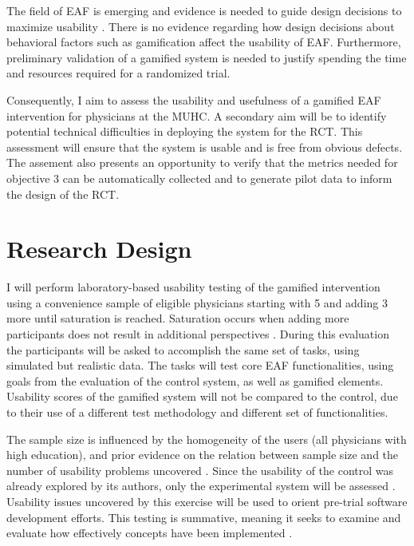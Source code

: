 %
%
The field of \gls{EAF} is emerging and evidence is needed to guide design decisions to maximize usability \cite{brown2016interface}. There is no evidence regarding how design decisions about behavioral factors such as gamification affect the usability of \gls{EAF}. Furthermore, preliminary validation of a gamified system is needed to justify spending the time and resources required for a randomized trial.

Consequently, I aim to assess the usability and usefulness of a gamified \gls{EAF} intervention for physicians at the \gls{MUHC}. A secondary aim will be to identify potential technical difficulties in deploying the system for the \gls{RCT}. This assessment will ensure that the system is usable and is free from obvious defects. The assement  also presents an opportunity to verify that the metrics needed for objective 3 can be automatically collected and to generate pilot data to inform the design of the RCT.

\section{Research Design}
I will perform laboratory-based usability testing of the gamified intervention using a convenience sample of eligible physicians starting with 5 and adding 3 more until saturation is reached. Saturation occurs when adding more participants does not result in additional perspectives \cite{green2018qualitative}. During this evaluation the participants will be asked to accomplish the same set of tasks, using simulated but realistic data. The tasks will test core \gls{EAF} functionalities, using goals from the evaluation of the control system, as well as gamified elements. Usability scores of the gamified system will not be compared to the control, due to their use of a different test methodology and different set of functionalities.

The sample size is influenced by the homogeneity of the users (all physicians with high education), and prior evidence on the relation between sample size and the number of usability problems uncovered \cite{nielsen1993mathematical}. Since the usability of the control was already explored by its authors, only the experimental system will be assessed \cite{brown2016interface}. Usability issues uncovered by this exercise will be used to orient pre-trial software development efforts. This testing is summative, meaning it seeks to examine and evaluate how effectively concepts have been implemented \cite{rubin2008handbook}.

